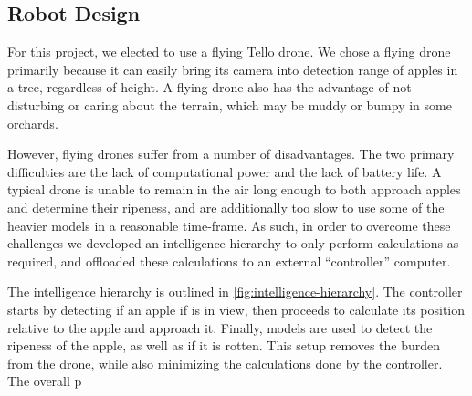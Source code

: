 \subsection{Robot Design}\label{subsec:robot-design}
For this project, we elected to use a flying Tello drone.
We chose a flying drone primarily because it can easily bring its camera into detection range of apples in a tree, regardless of height.
A flying drone also has the advantage of not disturbing or caring about the terrain, which may be muddy or bumpy in some orchards.

However, flying drones suffer from a number of disadvantages.
The two primary difficulties are the lack of computational power and the lack of battery life.
A typical drone is unable to remain in the air long enough to both approach apples and determine their ripeness, and are  additionally too slow to use some of the heavier models in a reasonable time-frame.
As such, in order to overcome these challenges we developed an intelligence hierarchy to only perform calculations as required, and offloaded these calculations to an external ``controller'' computer.

The intelligence hierarchy is outlined in \autoref{fig:intelligence-hierarchy}.
The controller starts by detecting if an apple if is in view, then proceeds to calculate its position relative to the apple and approach it.
Finally, models are used to detect the ripeness of the apple, as well as if it is rotten.
This setup removes the burden from the drone, while also minimizing the calculations done by the controller.
The overall p

